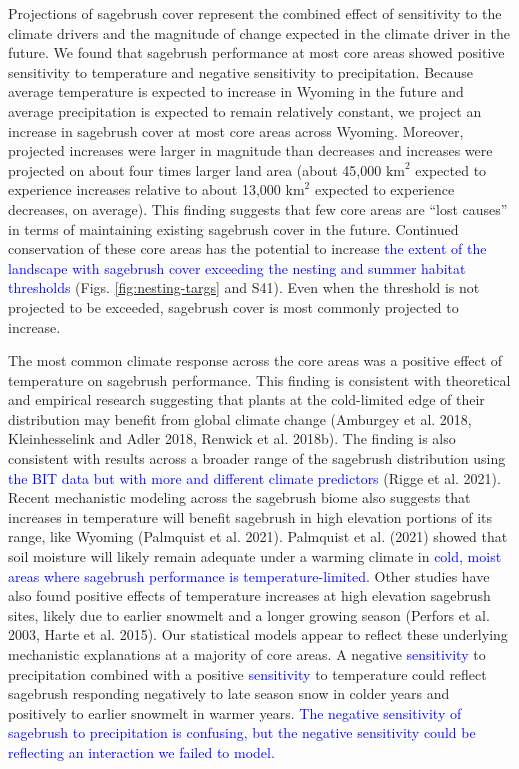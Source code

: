 \documentclass[
  12pt,
]{article}
\begin{document}
Projections of sagebrush cover represent the combined effect of sensitivity to the climate drivers and the magnitude of change expected in the climate driver in the future.
We found that sagebrush performance at most core areas showed positive sensitivity to temperature and negative sensitivity to precipitation.
Because average temperature is expected to increase in Wyoming in the future and average precipitation is expected to remain relatively constant, we project an increase in sagebrush cover at most core areas across Wyoming.
Moreover, projected increases were larger in magnitude than decreases and increases were projected on about four times larger land area (about 45,000 \(\text{km}^2\) expected to experience increases relative to about 13,000 \(\text{km}^2\) expected to experience decreases, on average).
This finding suggests that few core areas are ``lost causes'' in terms of maintaining existing sagebrush cover in the future.
Continued conservation of these core areas has the potential to increase \textcolor{blue}{the extent of the landscape with sagebrush cover exceeding the nesting and summer habitat thresholds} (Figs. \ref{fig:nesting-targs} and S41).
Even when the threshold is not projected to be exceeded, sagebrush cover is most commonly projected to increase.

The most common climate response across the core areas was a positive effect of temperature on sagebrush performance.
This finding is consistent with theoretical and empirical research suggesting that plants at the cold-limited edge of their distribution may benefit from global climate change (Amburgey et al. 2018, Kleinhesselink and Adler 2018, Renwick et al. 2018b).
The finding is also consistent with results across a broader range of the sagebrush distribution using \textcolor{blue}{the BIT data but with more and different climate predictors} (Rigge et al. 2021).
Recent mechanistic modeling across the sagebrush biome also suggests that increases in temperature will benefit sagebrush in high elevation portions of its range, like Wyoming (Palmquist et al. 2021).
Palmquist et al. (2021) showed that soil moisture will likely remain adequate under a warming climate in \textcolor{blue}{cold, moist areas where sagebrush performance is temperature-limited.}
Other studies have also found positive effects of temperature increases at high elevation sagebrush sites, likely due to earlier snowmelt and a longer growing season (Perfors et al. 2003, Harte et al. 2015).
Our statistical models appear to reflect these underlying mechanistic explanations at a majority of core areas.
A negative \textcolor{blue}{sensitivity} to precipitation combined with a positive \textcolor{blue}{sensitivity} to temperature could reflect sagebrush responding negatively to late season snow in colder years and positively to earlier snowmelt in warmer years.
\textcolor{blue}{The negative sensitivity of sagebrush to precipitation is confusing, but the negative sensitivity could be reflecting an interaction we failed to model.}
\end{document}

